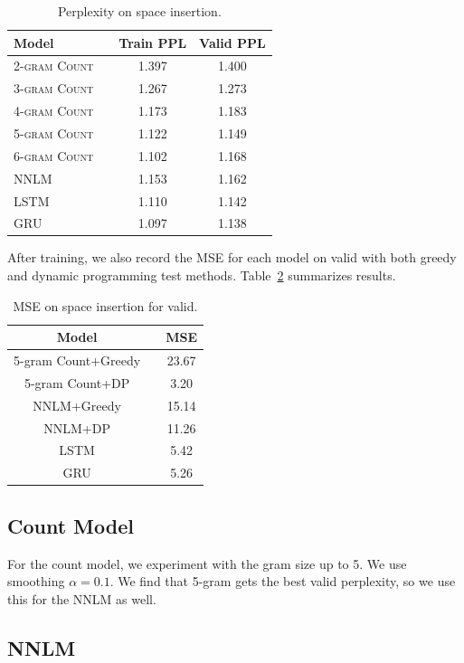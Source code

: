 \documentclass[11pt]{article}
\begin{document}
\begin{table}[h]
\centering
\begin{tabular}{llcc}
 \toprule
 Model &  & Train PPL & Valid PPL \\
 \midrule
 \textsc{2-gram Count} & &1.397 & 1.400 \\
 \textsc{3-gram Count} & &1.267 & 1.273 \\
 \textsc{4-gram Count} & &1.173 & 1.183  \\
 \textsc{5-gram Count} & &1.122 & 1.149 \\
 \textsc{6-gram Count} & &1.102 & 1.168 \\
 \textsc{NNLM} & & 1.153 & 1.162 \\
 \textsc{LSTM} & & 1.110 & 1.142 \\
 \textsc{GRU} &  & 1.097 & 1.138 \\
 \bottomrule
\end{tabular}
\caption{\label{tab:results} Perplexity on space insertion.}
\end{table}

After training, we also record the MSE for each model on valid with both greedy and dynamic programming test methods. Table~\ref{tab:mse} summarizes results.

\begin{table}[h]
\centering
  \begin{tabular}{ ccc}
    \hline Model &  & MSE \\
    \hline 5-gram Count+Greedy & & 23.67\\
    5-gram Count+DP & & 3.20 \\
    NNLM+Greedy & & 15.14\\
    NNLM+DP & & 11.26 \\
    LSTM &  & 5.42 \\
    GRU &  & 5.26 \\
    \hline
  \end{tabular}
\caption{MSE on space insertion for valid.}
\label{tab:mse} 
\end{table}

\subsection{Count Model}

For the count model, we experiment with the gram size up to 5. We use smoothing $\alpha = 0.1$. We find that 5-gram gets the best valid perplexity, so we use this for the NNLM as well.

\subsection{NNLM}
\end{document}

